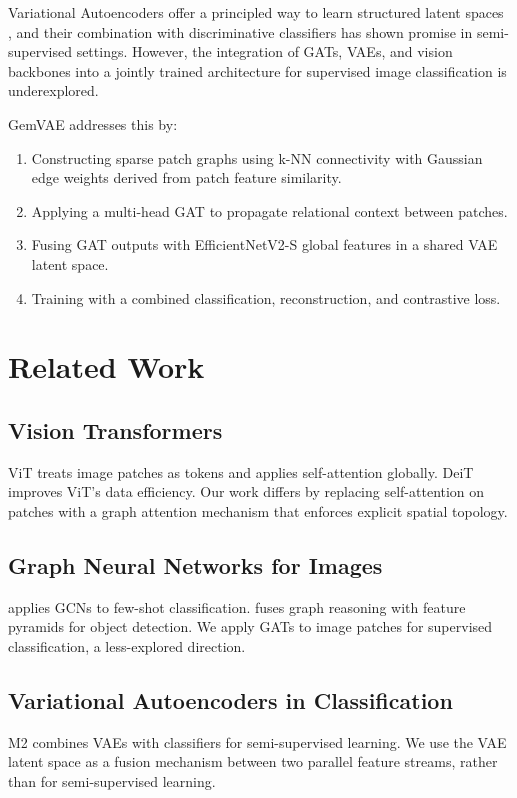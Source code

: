 \documentclass[conference]{IEEEtran}
\begin{document}
Variational Autoencoders offer a principled way to learn structured latent spaces \cite{kingma2013auto}, and their combination with discriminative classifiers has shown promise in semi-supervised settings. However, the integration of GATs, VAEs, and vision backbones into a jointly trained architecture for supervised image classification is underexplored.

GemVAE addresses this by:
\begin{enumerate}
\item Constructing sparse patch graphs using k-NN connectivity with Gaussian edge weights derived from patch feature similarity.
\item Applying a multi-head GAT to propagate relational context between patches.
\item Fusing GAT outputs with EfficientNetV2-S global features in a shared VAE latent space.
\item Training with a combined classification, reconstruction, and contrastive loss.
\end{enumerate}

\section{Related Work}

\subsection{Vision Transformers}
ViT \cite{dosovitskiy2020image} treats image patches as tokens and applies self-attention globally. DeiT \cite{touvron2021training} improves ViT's data efficiency. Our work differs by replacing self-attention on patches with a graph attention mechanism that enforces explicit spatial topology.

\subsection{Graph Neural Networks for Images}
\cite{chen2019graph} applies GCNs to few-shot classification. \cite{zhao2021graphfpn} fuses graph reasoning with feature pyramids for object detection. We apply GATs to image patches for supervised classification, a less-explored direction.

\subsection{Variational Autoencoders in Classification}
M2 \cite{kingma2014semi} combines VAEs with classifiers for semi-supervised learning. We use the VAE latent space as a fusion mechanism between two parallel feature streams, rather than for semi-supervised learning.
\end{document}
